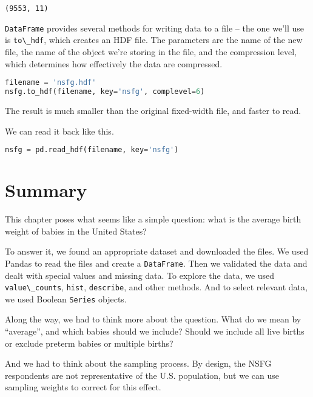 \begin{lstlisting}[style=output]
(9553, 11)
\end{lstlisting}

\passthrough{\lstinline!DataFrame!} provides several methods for writing
data to a file -- the one we'll use is
\passthrough{\lstinline!to\_hdf!}, which creates an HDF file. The
parameters are the name of the new file, the name of the object we're
storing in the file, and the compression level, which determines how
effectively the data are compressed.


\begin{lstlisting}[language=Python,style=source]
filename = 'nsfg.hdf'
nsfg.to_hdf(filename, key='nsfg', complevel=6)
\end{lstlisting}

The result is much smaller than the original fixed-width file, and
faster to read.

\pagebreak

We can read it back like this.

\begin{lstlisting}[language=Python,style=source]
nsfg = pd.read_hdf(filename, key='nsfg')
\end{lstlisting}

\section{Summary}\label{summary}

This chapter poses what seems like a simple question: what is the
average birth weight of babies in the United States?

To answer it, we found an appropriate dataset and downloaded the files.
We used Pandas to read the files and create a
\passthrough{\lstinline!DataFrame!}. Then we validated the data and
dealt with special values and missing data. To explore the data, we used
\passthrough{\lstinline!value\_counts!}, \passthrough{\lstinline!hist!},
\passthrough{\lstinline!describe!}, and other methods. And to select
relevant data, we used Boolean \passthrough{\lstinline!Series!} objects.

Along the way, we had to think more about the question. What do we mean
by ``average'', and which babies should we include? Should we include
all live births or exclude preterm babies or multiple births?

And we had to think about the sampling process. By design, the NSFG
respondents are not representative of the U.S. population, but we can
use sampling weights to correct for this effect.

